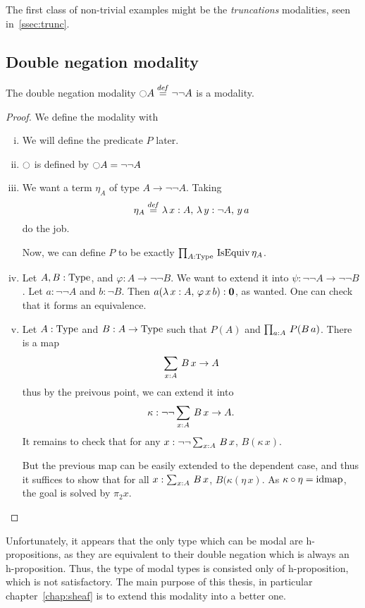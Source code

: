 The first class of non-trivial examples might be the {\em truncations}
modalities, seen in~\ref{ssec:trunc}.

\subsection{Double negation modality}
\label{ssec:notnot}

\begin{prop}
  The double negation modality $\ocircle A \overset{de\hspace{-0.2ex}f}{=} \lnot\lnot A$ is a
  modality.  
\end{prop}
\begin{proof}
  We define the modality with
  \begin{enumerate}[(i)]
  \item We will define the predicate $P$ later.
  \item $\ocircle$ is defined by $\ocircle A = \lnot\lnot A$
  \item We want a term $\eta_A$ of type $A \to \lnot \lnot A$.
    Taking 
    \[ \eta_A\overset{de\hspace{-0.2ex}f}{=} \lambda \, x:A,\,\lambda\, y:\lnot A,\, y\, a\] 
    do the job.
    
    Now, we can define $P$ to be exactly $\prod_{A:\operatorname{Type}}\, \operatorname{IsEquiv}
      \eta_A$.
  \item Let $A,B:\operatorname{Type}$, and $\varphi : A \to \lnot\lnot B$. We
    want to extend it into $\psi : \lnot\lnot A \to \lnot\lnot B$. Let
    $a:\lnot\lnot A$ and $b:\lnot B$.
    Then $a(\lambda\, x:A,\, \varphi\, x \, b) : \mathbf{0}$, as
    wanted. One can check that it forms an equivalence.
  \item Let $A:\operatorname{Type}$ and $B:A\to\operatorname{Type}$ such that $P(A)$ and $\prod_{a:A}\, P(B\, a)$. There is a map
    \[\sum_{x:A}\, B\, x \to A \]
    thus by the preivous point, we can extend it into 
    \[\kappa:\lnot\lnot\sum_{x:A}\, B\, x \to A.\]
    It remains to check that for any $x:\lnot\lnot\sum_{x:A}\, B\, x$,
    $B(\kappa\, x)$.

    But the previous map can be easily extended to the dependent case,
    and thus it suffices to show that for all $x:\sum_{x:A}\, B\, x$,
    $B(\kappa(\eta\, x)$. As $\kappa \circ \eta = \operatorname{\mathrm{idmap}}$, the goal is
    solved by $\pi_2 x$.
  \end{enumerate}
\end{proof}

Unfortunately, it appears that the only type which can be modal are
h-propositions, as they are equivalent to their double negation which
is always an h-proposition. Thus, the type of modal types is consisted
only of h-proposition, which is not satisfactory. The main purpose of this
thesis, in particular chapter~\ref{chap:sheaf} is to extend this
modality into a better one.

